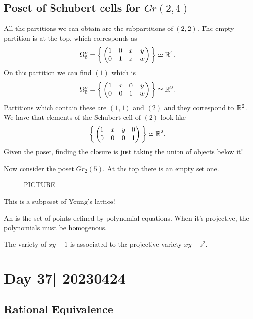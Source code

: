 \documentclass[12pt]{memoir}
\begin{document}
\subsection{Poset of Schubert cells for $Gr(2,4)$}

All the partitions we can obtain are the subpartitions of $(2,2)$. The empty partition is at the top, which corresponds as 
$$\Omega_\emptyset^o=\biggl\{\,\begin{pmatrix}1&0&x&y\\0&1&z&w\end{pmatrix}\,\biggr\}\simeq\mathbb{R}^4.$$
On this partition we can find $(1)$ which is 
$$\Omega_\emptyset^o=\biggl\{\,\begin{pmatrix}1&x&0&y\\0&0&1&w\end{pmatrix}\,\biggr\}\simeq\mathbb{R}^3.$$
Partitions which contain these are $(1,1)$ and $(2)$ and they correspond to $\mathbb{R}^2$. We have that elements of the Schubert cell of $(2)$ look like 
$$\biggl\{\,\begin{pmatrix}1&x&y&0\\0&0&0&1\end{pmatrix}\,\biggr\}\simeq\mathbb{R}^2.$$
Given the poset, finding the closure is just taking the union of objects below it!

\begin{Ex}
    Now consider the poset $Gr_2(5)$. At the top there is an empty set one.
    \begin{figure}
        PICTURE
    \end{figure}
    This is a subposet of Young's lattice!
\end{Ex}

\begin{Def}
    An  is the set of points defined by polynomial equations. When it's projective, the polynomials must be homogenous.
\end{Def}

\begin{Ex}
    The variety of $xy-1$ is associated to the projective variety $xy-z^2$.
\end{Ex}

\section{Day 37| 20230424}

\subsection{Rational Equivalence}
\end{document}
